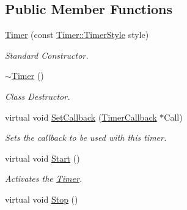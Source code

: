 \subsection*{Public Member Functions}
\begin{DoxyCompactItemize}
\item 
\hyperlink{classphys_1_1Timer_a25b70d2d45c5c56cce475841b7b18cd0}{Timer} (const \hyperlink{classphys_1_1Timer_a1ee86bf43e20329d750c5d582dcce329}{Timer::TimerStyle} style)
\begin{DoxyCompactList}\small\item\em Standard Constructor. \item\end{DoxyCompactList}\item 
\hypertarget{classphys_1_1Timer_ab96eede362c41f1ab56f1530cbae22b8}{
\hyperlink{classphys_1_1Timer_ab96eede362c41f1ab56f1530cbae22b8}{$\sim$Timer} ()}
\label{d3/d83/classphys_1_1Timer_ab96eede362c41f1ab56f1530cbae22b8}

\begin{DoxyCompactList}\small\item\em Class Destructor. \item\end{DoxyCompactList}\item 
virtual void \hyperlink{classphys_1_1Timer_a046ca4f7dcf2503e5993a18e11172f5e}{SetCallback} (\hyperlink{classphys_1_1TimerCallback}{TimerCallback} $\ast$Call)
\begin{DoxyCompactList}\small\item\em Sets the callback to be used with this timer. \item\end{DoxyCompactList}\item 
\hypertarget{classphys_1_1Timer_a2ec14a41cda7c31637351ab63f63304a}{
virtual void \hyperlink{classphys_1_1Timer_a2ec14a41cda7c31637351ab63f63304a}{Start} ()}
\label{d3/d83/classphys_1_1Timer_a2ec14a41cda7c31637351ab63f63304a}

\begin{DoxyCompactList}\small\item\em Activates the \hyperlink{classphys_1_1Timer}{Timer}. \item\end{DoxyCompactList}\item 
\hypertarget{classphys_1_1Timer_aa934478424678f84e8f4afb472eebbae}{
virtual void \hyperlink{classphys_1_1Timer_aa934478424678f84e8f4afb472eebbae}{Stop} ()}
\label{d3/d83/classphys_1_1Timer_aa934478424678f84e8f4afb472eebbae}


\end{DoxyCompactItemize}
